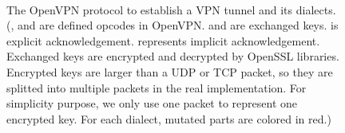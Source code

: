 \begin{figure}[!htb]
\centering
{} 
\\ 
\vspace{-0.1in}
\caption{The OpenVPN protocol to establish a VPN tunnel and its dialects.
(,  and  are defined opcodes in OpenVPN. 
  and  are exchanged 
  keys.
  is explicit acknowledgement. 
  represents implicit acknowledgement.
 Exchanged keys are encrypted and decrypted by OpenSSL libraries.
 Encrypted keys are larger than a UDP or TCP packet, 
 so they are splitted into multiple packets in the real implementation.
 For simplicity purpose, we only use one packet to represent one encrypted key. 
 For each dialect, mutated parts are colored in red.)} 
\label{fig:openvpn} 
\end{figure} 

